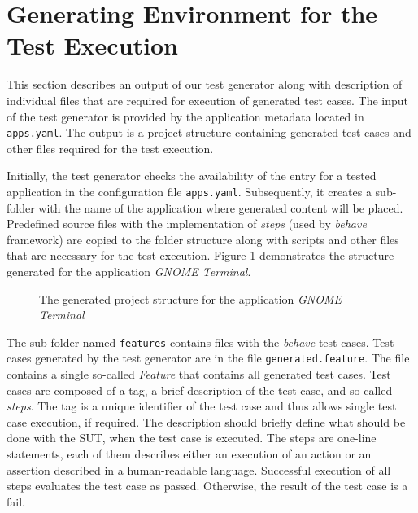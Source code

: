 \section{Generating Environment for the Test Execution}\label{generator_output}
This section describes an output of our test generator along with description of individual files that are required for execution of generated test cases. The input of the test generator is provided by the application metadata located in \texttt{apps.yaml}. The output is a project structure containing generated test cases and other files required for the test execution. 

Initially, the test generator checks the availability of the entry for a tested application in the configuration file \texttt{apps.yaml}. Subsequently, it creates a sub-folder with the name of the application where generated content will be placed. Predefined source files with the implementation of \textit{steps} (used by \textit{behave} framework) are copied to the folder structure along with scripts and other files that are necessary for the test execution. Figure \ref{project_folder} demonstrates the structure generated for the application \textit{GNOME Terminal}.

\begin{figure}[H]
\caption{The generated project structure for the application \textit{GNOME Terminal}}
\label{project_folder}
\end{figure}

The sub-folder named \texttt{features} contains files with the \textit{behave} test cases. Test cases generated by the test generator are in the file \texttt{generated.feature}. The file contains a single so-called \textit{Feature} that contains all generated test cases. Test cases are composed of a tag, a brief description of the test case, and so-called \textit{steps}. The tag is a unique identifier of the test case and thus allows single test case execution, if required. The description should briefly define what should be done with the SUT, when the test case is executed. The steps are one-line statements, each of them describes either an execution of an action or an assertion described in a human-readable language. Successful execution of all steps evaluates the test case as passed. Otherwise, the result of the test case is a fail.

